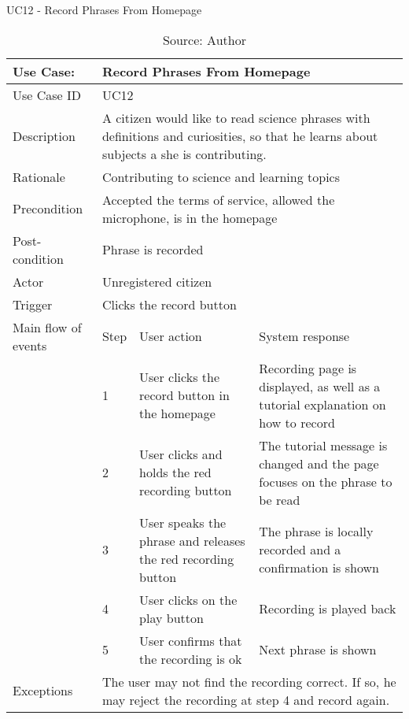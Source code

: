\begin{table}[h]
\centering
\caption{UC12 - Record Phrases From Homepage}
\label{uc:12}
\begin{tabular}{|p{3cm}|p{1cm}|p{5cm}|p{5cm}|}
\hline
Use Case:       & \multicolumn{3}{p{11cm}|}{Record Phrases From Homepage} \\ \hline
Use Case ID     & \multicolumn{3}{p{11cm}|}{UC12} \\ \hline
Description     & \multicolumn{3}{p{11cm}|}{A citizen would like to read science phrases with definitions and curiosities, so that he learns about subjects a she is contributing.} \\ \hline
Rationale       & \multicolumn{3}{p{11cm}|}{Contributing to science and learning topics} \\ \hline
Precondition    & \multicolumn{3}{p{11cm}|}{Accepted the terms of service, allowed the microphone, is in the homepage} \\ \hline
Post-condition  & \multicolumn{3}{p{11cm}|}{Phrase is recorded} \\ \hline
Actor           & \multicolumn{3}{p{11cm}|}{Unregistered citizen} \\ \hline
Trigger         & \multicolumn{3}{p{11cm}|}{Clicks the record button} \\ \hline
Main flow of events & Step  & User action & System response \\ \hline
                    & 1     & User clicks the record button in the homepage & Recording page is displayed, as well as a tutorial explanation on how to record \\ \hline
                    & 2     & User clicks and holds the red recording button & The tutorial message is changed and the page focuses on the phrase to be read \\ \hline
                    & 3     & User speaks the phrase and releases the red recording button & The phrase is locally recorded and a confirmation is shown \\ \hline
                    & 4     & User clicks on the play button & Recording is played back \\ \hline
                    & 5     & User confirms that the recording is ok & Next phrase is shown \\ \hline
Exceptions      & \multicolumn{3}{p{11cm}|}{The user may not find the recording correct. If so, he may reject the recording at step 4 and record again.} \\ \hline
\end{tabular}
\caption*{Source: Author}
\end{table}

